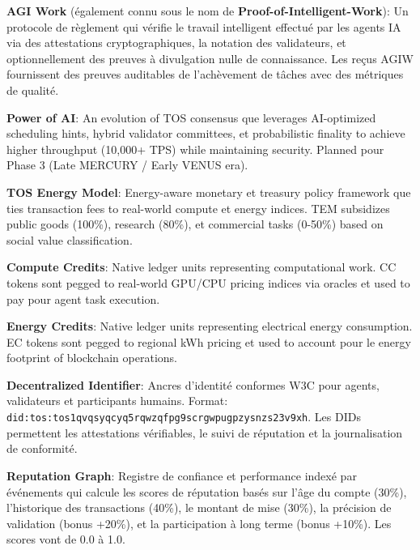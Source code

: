 \documentclass[11pt]{article}
\begin{document}
\begin{description}[leftmargin=3cm, style=nextline]
  \item[AGIW (PoIW)] \textbf{AGI Work} (également connu sous le nom de \textbf{Proof-of-Intelligent-Work}): Un protocole de règlement qui vérifie le travail intelligent effectué par les agents IA via des attestations cryptographiques, la notation des validateurs, et optionnellement des preuves à divulgation nulle de connaissance. Les reçus AGIW fournissent des preuves auditables de l'achèvement de tâches avec des métriques de qualité.

  \item[PAI] \textbf{Power of AI}: An evolution of TOS consensus que leverages AI-optimized scheduling hints, hybrid validator committees, et probabilistic finality to achieve higher throughput (10,000+ TPS) while maintaining security. Planned pour Phase 3 (Late MERCURY / Early VENUS era).

  \item[TEM] \textbf{TOS Energy Model}: Energy-aware monetary et treasury policy framework que ties transaction fees to real-world compute et energy indices. TEM subsidizes public goods (100\%), research (80\%), et commercial tasks (0-50\%) based on social value classification.

  \item[CC] \textbf{Compute Credits}: Native ledger units representing computational work. CC tokens sont pegged to real-world GPU/CPU pricing indices via oracles et used to pay pour agent task execution.

  \item[EC] \textbf{Energy Credits}: Native ledger units representing electrical energy consumption. EC tokens sont pegged to regional kWh pricing et used to account pour le energy footprint of blockchain operations.

  \item[DID] \textbf{Decentralized Identifier}: Ancres d'identité conformes W3C pour agents, validateurs et participants humains. Format: \texttt{did:tos:tos1qvqsyqcyq5rqwzqfpg9scrgwpugpzysnzs23v9xh}. Les DIDs permettent les attestations vérifiables, le suivi de réputation et la journalisation de conformité.

  \item[RepGraph] \textbf{Reputation Graph}: Registre de confiance et performance indexé par événements qui calcule les scores de réputation basés sur l'âge du compte (30\%), l'historique des transactions (40\%), le montant de mise (30\%), la précision de validation (bonus +20\%), et la participation à long terme (bonus +10\%). Les scores vont de 0.0 à 1.0.


\end{description}
\end{document}
